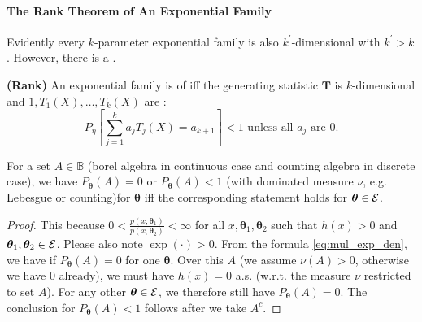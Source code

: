 \documentclass{article}
\newcommand{\bfs}[1]{\textbf{({#1}) }}
\begin{document}
\paragraph{The Rank Theorem of An Exponential Family}
Evidently every $k$-parameter exponential family is also $k^{\prime}$-dimensional with $k^{\prime}>k$. However, there is a .
\begin{defa}\bfs{Rank}
 An exponential family is of  iff the generating statistic $\mathbf{T}$ is $k$-dimensional and $1, T_{1}(X), \ldots, T_{k}(X)$ are :
 $$P_{\eta}\left[\sum_{j=1}^{k} a_{j} T_{j}(X)=a_{k+1}\right]<1 \text{ unless all $a_{j}$ are 0.}$$
\end{defa}

\begin{lema}\label{lem:drewqr}
For a set $A\in \mathbb{B}$ (borel algebra in continuous case and counting algebra in discrete case), we have $P_{\boldsymbol{\theta}}(A)=0$ or $P_{\boldsymbol{\theta}}(A)<1$ (with dominated measure $\nu$, e.g. Lebesgue or counting)for  $\boldsymbol{\theta}$ iff the corresponding statement holds for  $\boldsymbol{\theta}\in\mathcal{E}$.
\end{lema}
\begin{proof}
This because $0<\frac{p\left(x, \boldsymbol{\theta}_{1}\right)}{p\left(x, \boldsymbol{\theta}_{2}\right)}<\infty$ for all $x, \boldsymbol{\theta}_{1}, \boldsymbol{\theta}_{2}$ such that $h(x)>0$ and $\boldsymbol{\theta}_{1}, \boldsymbol{\theta}_{2}\in\mathcal{E}$. Please also note $\exp(\cdot)>0$. 
From the formula \cref{eq:mul_exp_den}, we have if $P_{\boldsymbol{\theta}}(A)=0$ for one $\boldsymbol{\theta}$. Over this $A$ (we assume $\nu(A)>0$, otherwise we have $0$ already), we must have $h(x)=0$ a.s. (w.r.t. the measure $\nu$  restricted to set $A$). For any other $\boldsymbol{\theta}\in\mathcal{E}$, we therefore still have $P_{\boldsymbol{\theta}}(A)=0$. The conclusion for $P_{\boldsymbol{\theta}}(A)<1$ follows after we take $A^c$.
\end{proof}
\end{document}
